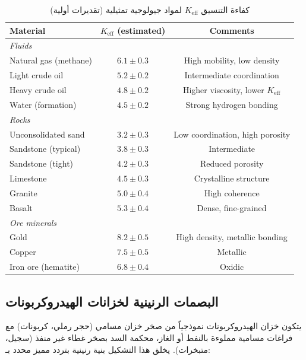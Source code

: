 \documentclass[12pt,a4paper]{article}
\newcommand{\Keff}{K_{\mathrm{eff}}}
\theoremstyle{remark}
\begin{document}
	\begin{otherlanguage}{english}
		\begin{table}[htbp]
			\centering
			\caption{كفاءة التنسيق \(\Keff\) لمواد جيولوجية تمثيلية (تقديرات أولية)}
			\label{tab:keff-geology}
			\small
			\begin{tabular}{lcc}
				\toprule
				\textbf{Material} & \textbf{\(\Keff\) (estimated)} & \textbf{Comments} \\
				\midrule
				\multicolumn{3}{l}{\textit{Fluids}} \\
				Natural gas (methane) & \(6.1 \pm 0.3\) & High mobility, low density \\
				Light crude oil & \(5.2 \pm 0.2\) & Intermediate coordination \\
				Heavy crude oil & \(4.8 \pm 0.2\) & Higher viscosity, lower \(\Keff\) \\
				Water (formation) & \(4.5 \pm 0.2\) & Strong hydrogen bonding \\
				\hline
				\multicolumn{3}{l}{\textit{Rocks}} \\
				Unconsolidated sand & \(3.2 \pm 0.3\) & Low coordination, high porosity \\
				Sandstone (typical) & \(3.8 \pm 0.3\) & Intermediate \\
				Sandstone (tight) & \(4.2 \pm 0.3\) & Reduced porosity \\
				Limestone & \(4.5 \pm 0.3\) & Crystalline structure \\
				Granite & \(5.0 \pm 0.4\) & High coherence \\
				Basalt & \(5.3 \pm 0.4\) & Dense, fine-grained \\
				\hline
				\multicolumn{3}{l}{\textit{Ore minerals}} \\
				Gold & \(8.2 \pm 0.5\) & High density, metallic bonding \\
				Copper & \(7.5 \pm 0.5\) & Metallic \\
				Iron ore (hematite) & \(6.8 \pm 0.4\) & Oxidic \\
				\bottomrule
			\end{tabular}
		\end{table}
	\end{otherlanguage}
	
	\subsection{البصمات الرنينية لخزانات الهيدروكربونات}
	
	يتكون خزان الهيدروكربونات نموذجياً من صخر خزان مسامي (حجر رملي، كربونات) مع فراغات مسامية مملوءة بالنفط أو الغاز، محكمة السد بصخر غطاء غير منفذ (سجيل، متبخرات). يخلق هذا التشكيل بنية رنينية بتردد مميز محدد بـ:
	
\end{document}
